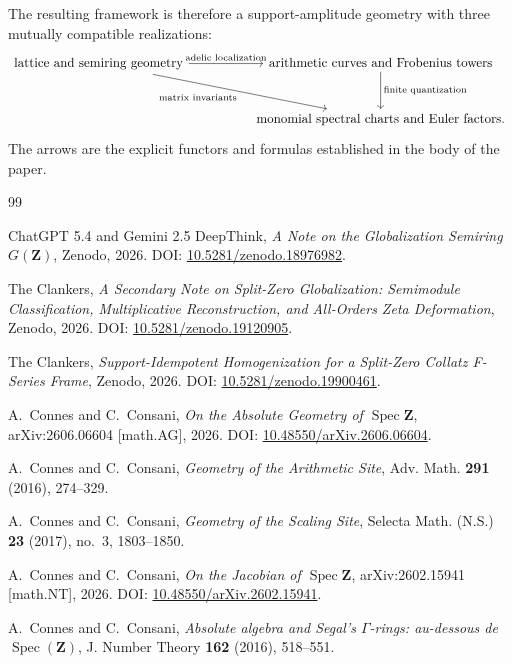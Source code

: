 \documentclass[11pt]{amsart}
\numberwithin{equation}{section}
\theoremstyle{definition}
\newcommand{\Z}{\mathbf Z}
\begin{document}
The resulting framework is therefore a support-amplitude geometry with
three mutually compatible realizations:
\[
\begin{tikzcd}[column sep=huge,row sep=large]
\text{lattice and semiring geometry}
  \arrow[r,"\text{adelic localization}"]
  \arrow[dr,"\text{matrix invariants}"']
& \text{arithmetic curves and Frobenius towers}
  \arrow[d,"\text{finite quantization}"]\\
& \text{monomial spectral charts and Euler factors}.
\end{tikzcd}
\]
The arrows are the explicit functors and formulas established in the body
of the paper.


\begin{thebibliography}{99}

ChatGPT 5.4 and Gemini 2.5 DeepThink,
\emph{A Note on the Globalization Semiring $G(\Z)$},
Zenodo, 2026.
DOI: \href{https://doi.org/10.5281/zenodo.18976982}{10.5281/zenodo.18976982}.

The Clankers,
\emph{A Secondary Note on Split-Zero Globalization: Semimodule
Classification, Multiplicative Reconstruction, and All-Orders Zeta
Deformation},
Zenodo, 2026.
DOI: \href{https://doi.org/10.5281/zenodo.19120905}{10.5281/zenodo.19120905}.

The Clankers,
\emph{Support-Idempotent Homogenization for a Split-Zero Collatz F-Series
Frame},
Zenodo, 2026.
DOI: \href{https://doi.org/10.5281/zenodo.19900461}{10.5281/zenodo.19900461}.

A.~Connes and C.~Consani,
\emph{On the Absolute Geometry of $\operatorname{Spec}\Z$},
arXiv:2606.06604 [math.AG], 2026.
DOI: \href{https://doi.org/10.48550/arXiv.2606.06604}{10.48550/arXiv.2606.06604}.

A.~Connes and C.~Consani,
\emph{Geometry of the Arithmetic Site},
Adv. Math. \textbf{291} (2016), 274--329.

A.~Connes and C.~Consani,
\emph{Geometry of the Scaling Site},
Selecta Math. (N.S.) \textbf{23} (2017), no.~3, 1803--1850.


A.~Connes and C.~Consani,
\emph{On the Jacobian of $\operatorname{Spec}\Z$},
arXiv:2602.15941 [math.NT], 2026.
DOI: \href{https://doi.org/10.48550/arXiv.2602.15941}{10.48550/arXiv.2602.15941}.

A.~Connes and C.~Consani,
\emph{Absolute algebra and Segal's $\Gamma$-rings: au-dessous de
$\operatorname{Spec}(\Z)$},
J. Number Theory \textbf{162} (2016), 518--551.


\end{thebibliography}
\end{document}
